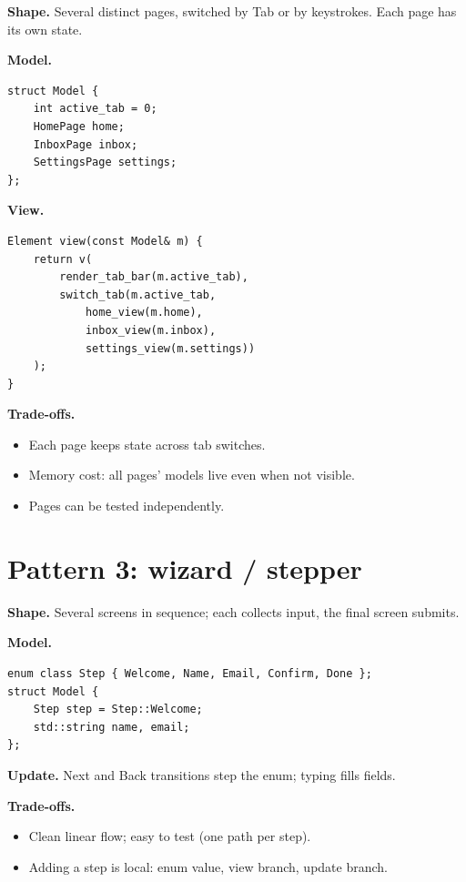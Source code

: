 \textbf{Shape.} Several distinct pages, switched by Tab or by
keystrokes. Each page has its own state.

\textbf{Model.}

\begin{lstlisting}
struct Model {
    int active_tab = 0;
    HomePage home;
    InboxPage inbox;
    SettingsPage settings;
};
\end{lstlisting}

\textbf{View.}

\begin{lstlisting}
Element view(const Model& m) {
    return v(
        render_tab_bar(m.active_tab),
        switch_tab(m.active_tab,
            home_view(m.home),
            inbox_view(m.inbox),
            settings_view(m.settings))
    );
}
\end{lstlisting}

\textbf{Trade-offs.}

\begin{itemize}[leftmargin=*]
  \item Each page keeps state across tab switches.
  \item Memory cost: all pages' models live even when not
    visible.
  \item Pages can be tested independently.
\end{itemize}

\section{Pattern 3: wizard / stepper}

\textbf{Shape.} Several screens in sequence; each collects input,
the final screen submits.

\textbf{Model.}

\begin{lstlisting}
enum class Step { Welcome, Name, Email, Confirm, Done };
struct Model {
    Step step = Step::Welcome;
    std::string name, email;
};
\end{lstlisting}

\textbf{Update.} Next and Back transitions step the enum;
typing fills fields.

\textbf{Trade-offs.}

\begin{itemize}[leftmargin=*]
  \item Clean linear flow; easy to test (one path per step).
  \item Adding a step is local: enum value, view branch, update
    branch.
\end{itemize}

